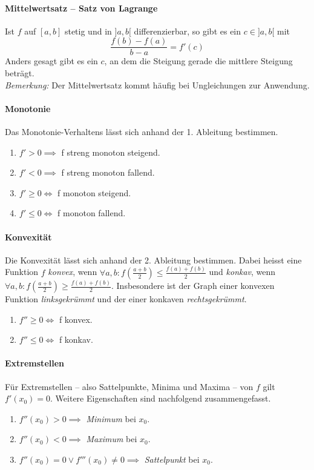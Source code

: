 \documentclass[a4paper, 9pt, DIV=24]{scrartcl}
\begin{document}
\paragraph{Mittelwertsatz -- Satz von Lagrange}
Ist $f$ auf $[a,b]$ stetig und in $]a,b[$ differenzierbar, so gibt es ein $c \in ]a,b[$ mit
\[ \dfrac{f(b) - f(a)}{b-a} = f'(c) \]
Anders gesagt gibt es ein $c$, an dem die Steigung gerade die mittlere Steigung beträgt.\\
\emph{Bemerkung:} Der Mittelwertsatz kommt häufig bei Ungleichungen zur Anwendung.

\paragraph{Monotonie}
Das Monotonie-Verhaltens lässt sich anhand der 1. Ableitung bestimmen.
\begin{enumerate}[label={(}\arabic*{)}]
 \item $f' > 0 \implies $ f streng monoton steigend.
 \item $f' < 0 \implies $ f streng monoton fallend.
 \item $f' \geq 0 \iff $ f monoton steigend.
 \item $f' \leq 0 \iff $ f monoton fallend.
\end{enumerate}

\paragraph{Konvexität}
Die Konvexität lässt sich anhand der 2. Ableitung bestimmen.
Dabei heisst eine Funktion $f$ \emph{konvex}, wenn $\forall a,b: f(\frac{a+b}{2}) \leq \frac{f(a)+f(b)}{2}$
und \emph{konkav}, wenn $\forall a,b: f(\frac{a+b}{2}) \geq \frac{f(a)+f(b)}{2}$.
Insbesondere ist der Graph einer konvexen Funktion \emph{linksgekrümmt} und der einer konkaven \emph{rechtsgekrümmt}.
\begin{enumerate}[label={(}\arabic*{)}]
 \item $f'' \geq 0 \iff $ f konvex.
 \item $f'' \leq 0 \iff $ f konkav.
\end{enumerate}

\paragraph{Extremstellen}
Für Extremstellen -- also Sattelpunkte, Minima und Maxima -- von $f$ gilt $f'(x_0) = 0$.
Weitere Eigenschaften sind nachfolgend zusammengefasst.
\begin{enumerate}[label={(}\arabic*{)}]
 \item $f''(x_0) > 0 \implies$ \emph{Minimum} bei $x_0$.
 \item $f''(x_0) < 0 \implies$ \emph{Maximum} bei $x_0$.
 \item $f''(x_0) = 0 \vee f'''(x_0) \neq 0 \implies$ \emph{Sattelpunkt} bei $x_0$.
\end{enumerate}
\end{document}
